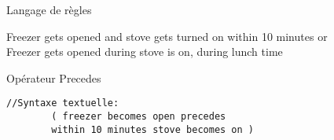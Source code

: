 \begin{frame}[fragile]{Langage de règles}
  \addtocounter{framenumber}{-1}
  \vspace*{3.7mm}
  \begin{coloredbox}[gray]{}
    \begin{footnotesize}
      Freezer \colorbox{black!2}{gets opened} \colorbox{teal!50}{and} stove gets turned on \colorbox{teal!50}{within 10 minutes} or\\ Freezer gets opened during stove \colorbox{black!2}{is on}, during lunch time
    \end{footnotesize}
  \end{coloredbox}
  \vfill
  \begin{minipage}{.55\linewidth}
    \begin{coloredbox}[teal]{Opérateur Precedes}
      \begin{lstlisting}[language=MaloyaText,basicstyle=\ttfamily\scriptsize]
        //Syntaxe textuelle:
        ( freezer becomes open precedes 
        within 10 minutes stove becomes on )
      \end{lstlisting}
    \end{coloredbox}
  \end{minipage}
  \hfill
  \begin{minipage}{.43\linewidth}
    \begin{scriptsize}
\end{scriptsize}
\end{minipage}
\end{frame}
